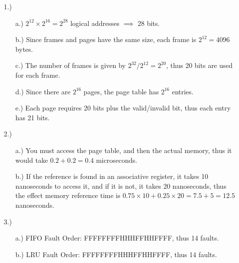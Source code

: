 \documentclass[12pt]{article}
\begin{document}
    \pagestyle{fancy}


    \begin{itemize}
        \item [1.)] \begin{itemize}
            \item [a.)] \( 2^{12} \times 2^{16} = 2^{28} \) logical addresses \( \implies \) 28 bits.

            \item [b.)] Since frames and pages have the same size, each frame is \( 2^{12} = 4096 \) bytes.

            \item [c.)] The number of frames is given by \( 2^{32} / 2^{12} = 2^{20} \), thus 20 bits
                are used for each frame.

            \item [d.)] Since there are \( 2^{16} \) pages, the page table has \( 2^{16} \) entries.

            \item [e.)] Each page requires 20 bits plus the valid/invalid bit, thus each entry has
                21 bits.
        \end{itemize}

        \item [2.)] \begin{itemize}
            \item[a.)] You must access the page table, and then the actual memory, thus it would take
                \( 0.2 + 0.2 = 0.4 \) microseconds.

            \item[b.)] If the reference is found in an associative register, it takes 10 nanoseconds
                to access it, and if it is not, it takes 20 nanoseconds, thus the effect memory reference
                time is \( 0.75 \times 10 + 0.25 \times 20 = 7.5 + 5 = 12.5 \) nanoseconds.
        \end{itemize}

        \item [3.)] \begin{itemize}
            \item [a.)] FIFO Fault Order: FFFFFFFFHHHFFHHFFFF, thus 14 faults.

            \item [b.)] LRU Fault Order: FFFFFFFFHHHFFHHFFFF, thus 14 faults.


\end{itemize}
\end{itemize}
\end{document}
